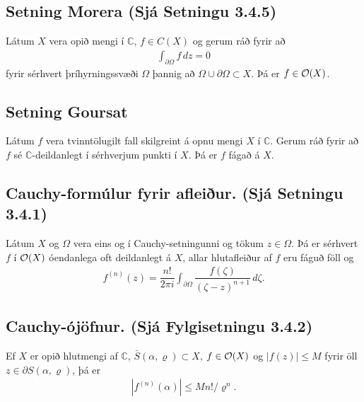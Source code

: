 \documentclass[a4paper,10pt,icelandic]{sphinxmanual}
\begin{document}
\subsection{Setning Morera (Sjá Setningu 3.4.5)}
\label{\detokenize{Kafli03:setning-morera-sja-setningu-3-4-5}}
Látum \(X\) vera opið mengi í \({\mathbb{C}}\), \(f\in C(X)\) og gerum ráð fyrir að
\begin{equation*}
\begin{split}\int_{\partial\Omega} f\, dz =0\end{split}
\end{equation*}
fyrir sérhvert þríhyrningssvæði \(\Omega\) þannig að \(\Omega\cup \partial \Omega\subset X\). Þá er \(f\in {\cal O}(X)\).


\subsection{Setning Goursat}
\label{\detokenize{Kafli03:setning-goursat}}
Látum \(f\) vera tvinntölugilt fall skilgreint á opnu mengi \(X\) í \({\mathbb{C}}\). Gerum ráð fyrir að \(f\) sé \({\mathbb{C}}\)-deildanlegt í sérhverjum punkti í \(X\). Þá er \(f\) fágað á \(X\).


\subsection{Cauchy-formúlur fyrir afleiður. (Sjá Setningu 3.4.1)}
\label{\detokenize{Kafli03:cauchy-formulur-fyrir-afleiur-sja-setningu-3-4-1}}
Látum \(X\) og \(\Omega\) vera eins og í Cauchy-setningunni og tökum \(z\in \Omega\). Þá er sérhvert \(f\) í \({\cal O}(X)\) óendanlega oft deildanlegt á \(X\), allar hlutafleiður af \(f\) eru fáguð föll og
\begin{equation*}
\begin{split}f^{(n)}(z)=
\dfrac {n!}{2\pi i}\int_{\partial\Omega}
\dfrac {f(\zeta)}{(\zeta-z)^ {n+1}}\, d\zeta.\end{split}
\end{equation*}

\subsection{Cauchy-ójöfnur. (Sjá Fylgisetningu 3.4.2)}
\label{\detokenize{Kafli03:cauchy-ojofnur-sja-fylgisetningu-3-4-2}}
Ef \(X\) er opið hlutmengi af \({\mathbb{C}}\), \(\bar S(\alpha,\varrho)\subset X\), \(f\in {\cal O}(X)\) og \(|f(z)|\leq M\) fyrir öll \(z\in \partial
S(\alpha,\varrho)\), þá er
\begin{equation*}
\begin{split}|f^{(n)}(\alpha)|\leq
Mn!/\varrho^ n.\end{split}
\end{equation*}
\end{document}
